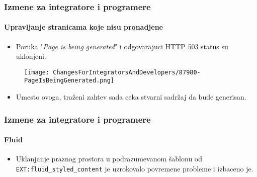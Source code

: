 
\begin{frame}[fragile]
	\frametitle{Izmene za integratore i programere}
	\framesubtitle{Upravljanje stranicama koje nisu pronadjene}

	\begin{itemize}

		\item Poruka "\textit{Page is being generated}" i odgovarajuci
			HTTP 503 status su uklonjeni.
	\end{itemize}

	\begin{figure}
		\texttt{[image: ChangesForIntegratorsAndDevelopers/87980-PageIsBeingGenerated.png]}
	\end{figure}

	\begin{itemize}
		\item Umesto ovoga, traženi zahtev sada ceka stvarni sadržaj da bude generisan.
	\end{itemize}

\end{frame}


\begin{frame}[fragile]
	\frametitle{Izmene za integratore i programere}
	\framesubtitle{Fluid}

	\begin{itemize}
		\item Uklanjanje praznog prostora u podrazumevanom šablonu od \texttt{EXT:fluid\_styled\_content}
			je uzrokovalo povremene probleme i izbaceno je.

	\end{itemize}

\end{frame}


